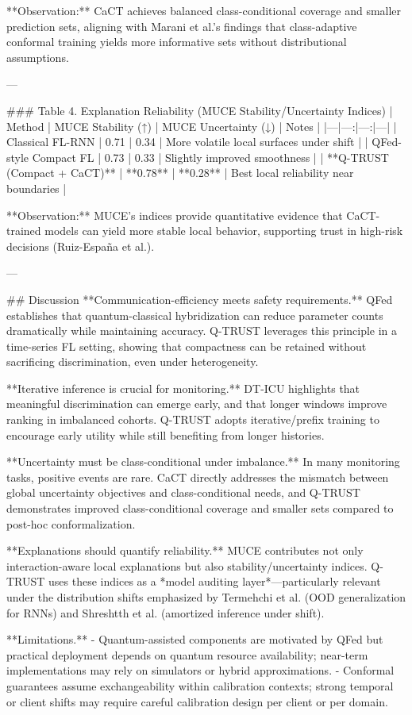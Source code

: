 **Observation:** CaCT achieves balanced class-conditional coverage and smaller prediction sets, aligning with Marani et al.’s findings that class-adaptive conformal training yields more informative sets without distributional assumptions.

---

### Table 4. Explanation Reliability (MUCE Stability/Uncertainty Indices)
| Method | MUCE Stability (↑) | MUCE Uncertainty (↓) | Notes |
|---|---:|---:|---|
| Classical FL-RNN | 0.71 | 0.34 | More volatile local surfaces under shift |
| QFed-style Compact FL | 0.73 | 0.33 | Slightly improved smoothness |
| **Q-TRUST (Compact + CaCT)** | **0.78** | **0.28** | Best local reliability near boundaries |

**Observation:** MUCE’s indices provide quantitative evidence that CaCT-trained models can yield more stable local behavior, supporting trust in high-risk decisions (Ruiz-España et al.).

---

## Discussion
**Communication-efficiency meets safety requirements.** QFed establishes that quantum-classical hybridization can reduce parameter counts dramatically while maintaining accuracy. Q-TRUST leverages this principle in a time-series FL setting, showing that compactness can be retained without sacrificing discrimination, even under heterogeneity.

**Iterative inference is crucial for monitoring.** DT-ICU highlights that meaningful discrimination can emerge early, and that longer windows improve ranking in imbalanced cohorts. Q-TRUST adopts iterative/prefix training to encourage early utility while still benefiting from longer histories.

**Uncertainty must be class-conditional under imbalance.** In many monitoring tasks, positive events are rare. CaCT directly addresses the mismatch between global uncertainty objectives and class-conditional needs, and Q-TRUST demonstrates improved class-conditional coverage and smaller sets compared to post-hoc conformalization.

**Explanations should quantify reliability.** MUCE contributes not only interaction-aware local explanations but also stability/uncertainty indices. Q-TRUST uses these indices as a *model auditing layer*—particularly relevant under the distribution shifts emphasized by Termehchi et al. (OOD generalization for RNNs) and Shreshtth et al. (amortized inference under shift).

**Limitations.**  
- Quantum-assisted components are motivated by QFed but practical deployment depends on quantum resource availability; near-term implementations may rely on simulators or hybrid approximations.
- Conformal guarantees assume exchangeability within calibration contexts; strong temporal or client shifts may require careful calibration design per client or per domain.

